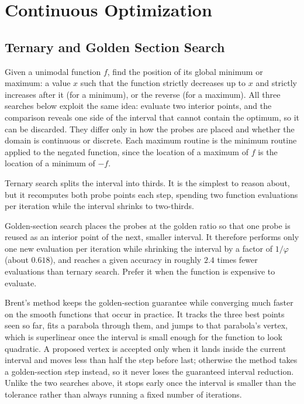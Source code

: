 \section{\texorpdfstring{Continuous Optimization}{5.2 Continuous Optimization}}
\setcounter{section}{2}
\setcounter{subsection}{0}
\subsection{Ternary and Golden Section Search}
\label{sec:5.2.1}
Given a unimodal function $f$, find the position of its global minimum or maximum: a value $x$ such that the function strictly decreases up to $x$ and strictly increases after it (for a minimum), or the reverse (for a maximum). All three searches below exploit the same idea: evaluate two interior points, and the comparison reveals one side of the interval that cannot contain the optimum, so it can be discarded. They differ only in how the probes are placed and whether the domain is continuous or discrete. Each maximum routine is the minimum routine applied to the negated function, since the location of a maximum of $f$ is the location of a minimum of $-f$.

Ternary search splits the interval into thirds. It is the simplest to reason about, but it recomputes both probe points each step, spending two function evaluations per iteration while the interval shrinks to two-thirds.

Golden-section search places the probes at the golden ratio so that one probe is reused as an interior point of the next, smaller interval. It therefore performs only one new evaluation per iteration while shrinking the interval by a factor of $1/\varphi$ (about $0.618$), and reaches a given accuracy in roughly $2.4$ times fewer evaluations than ternary search. Prefer it when the function is expensive to evaluate.

Brent's method keeps the golden-section guarantee while converging much faster on the smooth functions that occur in practice. It tracks the three best points seen so far, fits a parabola through them, and jumps to that parabola's vertex, which is superlinear once the interval is small enough for the function to look quadratic. A proposed vertex is accepted only when it lands inside the current interval and moves less than half the step before last; otherwise the method takes a golden-section step instead, so it never loses the guaranteed interval reduction. Unlike the two searches above, it stops early once the interval is smaller than the tolerance rather than always running a fixed number of iterations.

